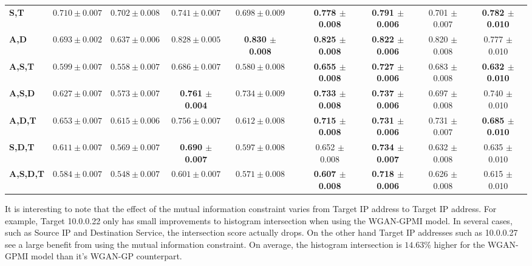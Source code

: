 \begin{table}[!htbp]
\begin{adjustbox}{angle=90}
\begin{tabular}{l|c|c|c|c|c|c|c|c|c|}
		\textbf{S,T} & $0.710 \pm 0.007$ & $0.702 \pm 0.008$ & $0.741 \pm 0.007$ & $0.698 \pm 0.009$ & & \textbf{0.778 $\pm$ 0.008} & \textbf{0.791 $\pm$ 0.006} & 0.701 $\pm$ 0.007 & \textbf{0.782 $\pm$ 0.010} \\
		\textbf{A,D} & $0.693 \pm 0.002$ & $0.637 \pm 0.006$ & $0.828 \pm 0.005$ & \textbf{0.830 $\pm$ 0.008} & & \textbf{0.825 $\pm$ 0.008} & \textbf{0.822 $\pm$ 0.006} & 0.820 $\pm$ 0.008 & 0.777 $\pm$ 0.010 \\ \hline
		\textbf{A,S,T} & $0.599 \pm 0.007$ & $0.558 \pm 0.007$ & $0.686 \pm 0.007$ & $0.580 \pm 0.008$ & & \textbf{0.655 $\pm$ 0.008} & \textbf{0.727 $\pm$ 0.006} & 0.683 $\pm$ 0.008 & \textbf{0.632 $\pm$ 0.010} \\
		\textbf{A,S,D} & $0.627 \pm 0.007$ & $0.573 \pm 0.007$ & \textbf{0.761 $\pm$ 0.004} & $0.734 \pm 0.009$ & & \textbf{0.733 $\pm$ 0.008} & \textbf{0.737 $\pm$ 0.006} & 0.697 $\pm$ 0.008 & 0.740 $\pm$ 0.010 \\
		\textbf{A,D,T} & $0.653 \pm 0.007$ & $0.615 \pm 0.006$ & $0.756 \pm 0.007$ & $0.612 \pm 0.008$ & & \textbf{0.715 $\pm$ 0.008} & \textbf{0.731 $\pm$ 0.006} & 0.731 $\pm$ 0.007 & \textbf{0.685 $\pm$ 0.010} \\
		\textbf{S,D,T} & $0.611 \pm 0.007$ & $0.569 \pm 0.007$ & \textbf{0.690 $\pm$ 0.007} & $0.597 \pm 0.008$ & & 0.652 $\pm$ 0.008 & \textbf{0.734 $\pm$ 0.007} & 0.632 $\pm$ 0.008 & 0.635 $\pm$ 0.010 \\ \hline
		\textbf{A,S,D,T} & $0.584 \pm 0.007$ & $0.548 \pm 0.007$ & $0.601 \pm 0.007$ & $0.571 \pm 0.008$ & & \textbf{0.607 $\pm$ 0.008} & \textbf{0.718 $\pm$ 0.006} & 0.626 $\pm$ 0.008 & 0.615 $\pm$ 0.010 \\
	\end{tabular}
	\end{adjustbox}
\end{table}

It is interesting to note that the effect of the mutual information constraint varies from Target IP address to Target IP address. For example, Target 10.0.0.22 only has small improvements to histogram intersection when using the WGAN-GPMI model. In several cases, such as Source IP and Destination Service, the intersection score actually drops. On the other hand Target IP addresses such as 10.0.0.27 see a large benefit from using the mutual information constraint. On average, the histogram intersection is $14.63$\% higher for the WGAN-GPMI model than it's WGAN-GP counterpart.

